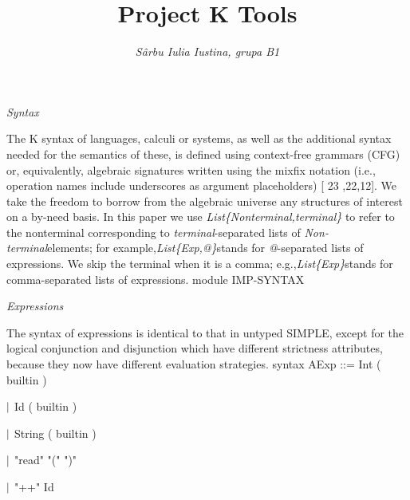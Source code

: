 \documentclass{article}
\begin{document}
\title{Project K Tools}
\maketitle
\author{\textit{S\^{a}rbu Iulia Iustina, grupa B1}}
\newline
\newline
\textit{Syntax}\newline

 \qquad The K syntax of languages, calculi or systems, as well as the additional syntax needed for the semantics of these, is defined using context-free grammars (CFG) or, equivalently, algebraic signatures written using the mixfix notation (i.e., operation names include underscores as argument placeholders) [ 23 ,22,12]. We take the freedom to borrow from the algebraic universe any structures of interest on a by-need basis.  In this paper we use \textit{List\{Nonterminal,terminal\}} to refer to the nonterminal corresponding to \textit{terminal}-separated lists of \textit{Non-terminal}elements; for example,\textit{List\{Exp,@\}}stands for \textit{@}-separated lists of expressions. We skip the terminal when it is a comma; e.g.,\textit{List\{Exp\}}stands for comma-separated lists of expressions.\newline\newline
module IMP-SYNTAX
\newline
\newline

\textit{Expressions}
\newline

 \qquad The syntax of expressions is identical to that in untyped SIMPLE, except for  the  logical  conjunction  and  disjunction  which  have  different  strictness attributes, because they now have different evaluation strategies.\newline\newline
syntax AExp ::=  Int  (  builtin ) 


 
\hspace{35pt} \qquad $\arrowvert$  Id  (  builtin ) 


 
\hspace{35pt} \qquad $\arrowvert$  String  (  builtin ) 


 
\hspace{35pt} \qquad $\arrowvert$ 
"read"
"(" ")"

 
\hspace{35pt} \qquad $\arrowvert$ 
"++" Id 
\end{document}
